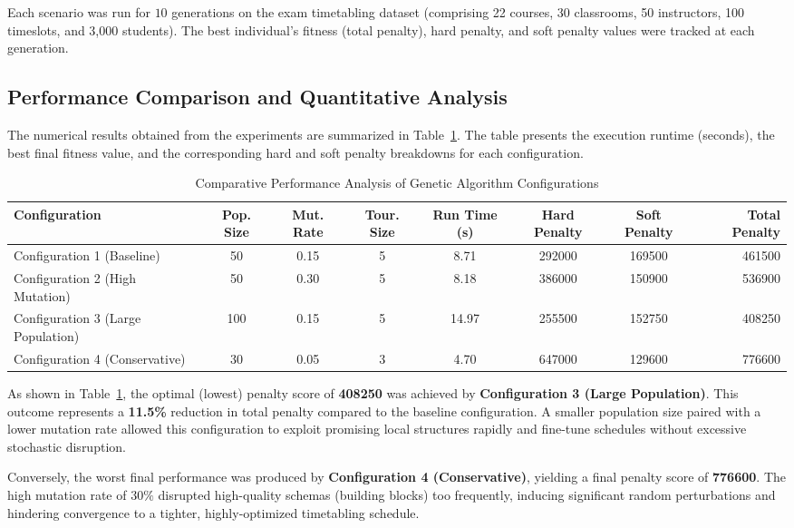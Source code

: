Each scenario was run for $10$ generations on the exam timetabling dataset (comprising 22 courses, 30 classrooms, 50 instructors, 100 timeslots, and 3,000 students). The best individual's fitness (total penalty), hard penalty, and soft penalty values were tracked at each generation.

\subsection{Performance Comparison and Quantitative Analysis}
\label{subsec:performance_comparisons}

The numerical results obtained from the experiments are summarized in Table~\ref{tab:ga_experiments}. The table presents the execution runtime (seconds), the best final fitness value, and the corresponding hard and soft penalty breakdowns for each configuration.

\begin{table}[htbp]
\centering
\caption{Comparative Performance Analysis of Genetic Algorithm Configurations}
\label{tab:ga_experiments}
\begin{tabular}{lccccccr}
\hline
\textbf{Configuration} & \textbf{Pop. Size} & \textbf{Mut. Rate} & \textbf{Tour. Size} & \textbf{Run Time (s)} & \textbf{Hard Penalty} & \textbf{Soft Penalty} & \textbf{Total Penalty} \\ \hline
Configuration 1 (Baseline) & 50 & 0.15 & 5 & 8.71 & 292000 & 169500 & 461500 \\
Configuration 2 (High Mutation) & 50 & 0.30 & 5 & 8.18 & 386000 & 150900 & 536900 \\
Configuration 3 (Large Population) & 100 & 0.15 & 5 & 14.97 & 255500 & 152750 & 408250 \\
Configuration 4 (Conservative) & 30 & 0.05 & 3 & 4.70 & 647000 & 129600 & 776600 \\ \hline
\end{tabular}
\end{table}

As shown in Table~\ref{tab:ga_experiments}, the optimal (lowest) penalty score of \textbf{408250} was achieved by \textbf{Configuration 3 (Large Population)}. This outcome represents a \textbf{11.5\%} reduction in total penalty compared to the baseline configuration. A smaller population size paired with a lower mutation rate allowed this configuration to exploit promising local structures rapidly and fine-tune schedules without excessive stochastic disruption.

Conversely, the worst final performance was produced by \textbf{Configuration 4 (Conservative)}, yielding a final penalty score of \textbf{776600}. The high mutation rate of $30\%$ disrupted high-quality schemas (building blocks) too frequently, inducing significant random perturbations and hindering convergence to a tighter, highly-optimized timetabling schedule.

